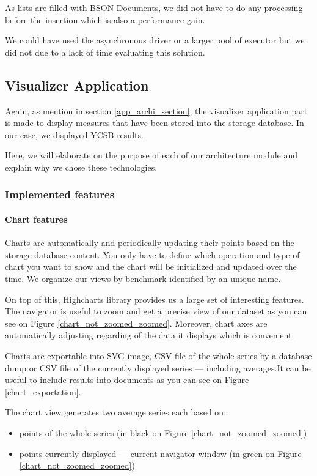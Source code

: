 \documentclass[a4paper,11pt]{report}
\begin{document}
As lists are filled with BSON Documents, we did not have to do any processing before the insertion which is also a performance gain. 

\bigskip

We could have used the asynchronous driver or a larger pool of executor but we did not due to a lack of time evaluating this solution.

\subsection{Visualizer Application}

Again, as mention in section \ref{app_archi_section}, the visualizer application part is made to display measures that have been stored into the storage database. In our case, we displayed YCSB results. 

Here, we will elaborate on the purpose of each of our architecture module and explain why we chose these technologies.

\subsubsection{Implemented features}

\paragraph{Chart features}

Charts are automatically and periodically updating their points based on the storage database content. You only have to define which operation and type of chart you want to show and the chart will be initialized and updated over the time. We organize our views by benchmark identified by an unique name.

On top of this, Highcharts library \cite{highcharts:website} provides us a large set of interesting features. 
The navigator is useful to zoom and get a precise view of our dataset as you can see on Figure \ref{chart_not_zoomed_zoomed}. 
Moreover, chart axes are automatically adjusting regarding of the data it displays which is convenient. 

Charts are exportable into SVG image, CSV file of the whole series by a database dump or CSV file of the currently displayed series --- including averages.It can be useful to include results into documents as you can see on Figure \ref{chart_exportation}.

The chart view generates two average series each based on:
\begin{itemize}
\item
points of the whole series (in black on Figure \ref{chart_not_zoomed_zoomed})
\item
points currently displayed --- current navigator window (in green on Figure \ref{chart_not_zoomed_zoomed})
\end{itemize}
\end{document}

